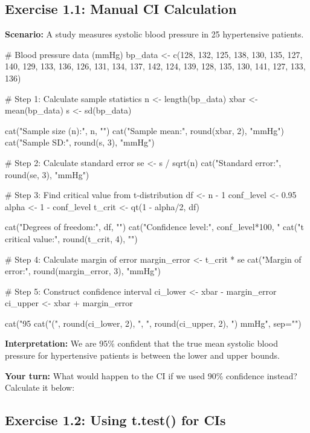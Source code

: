 \documentclass[11pt]{article}
\begin{document}
\subsection{Exercise 1.1: Manual CI Calculation}

\textbf{Scenario:} A study measures systolic blood pressure in 25 hypertensive patients.

\begin{rcode}
# Blood pressure data (mmHg)
bp_data <- c(128, 132, 125, 138, 130, 135, 127, 140, 129, 133,
             136, 126, 131, 134, 137, 142, 124, 139, 128, 135,
             130, 141, 127, 133, 136)

# Step 1: Calculate sample statistics
n <- length(bp_data)
xbar <- mean(bp_data)
s <- sd(bp_data)

cat("Sample size (n):", n, "\n")
cat("Sample mean:", round(xbar, 2), "mmHg\n")
cat("Sample SD:", round(s, 3), "mmHg\n\n")

# Step 2: Calculate standard error
se <- s / sqrt(n)
cat("Standard error:", round(se, 3), "mmHg\n\n")

# Step 3: Find critical value from t-distribution
df <- n - 1
conf_level <- 0.95
alpha <- 1 - conf_level
t_crit <- qt(1 - alpha/2, df)

cat("Degrees of freedom:", df, "\n")
cat("Confidence level:", conf_level*100, "%
cat("t critical value:", round(t_crit, 4), "\n\n")

# Step 4: Calculate margin of error
margin_error <- t_crit * se
cat("Margin of error:", round(margin_error, 3), "mmHg\n\n")

# Step 5: Construct confidence interval
ci_lower <- xbar - margin_error
ci_upper <- xbar + margin_error

cat("95%
cat("(", round(ci_lower, 2), ", ", round(ci_upper, 2), ") mmHg\n", sep="")
\end{rcode}

\textbf{Interpretation:} We are 95\% confident that the true mean systolic blood pressure for hypertensive patients is between the lower and upper bounds.

\vspace{0.5cm}

\textbf{Your turn:} What would happen to the CI if we used 90\% confidence instead? Calculate it below:

\vspace{2cm}

\subsection{Exercise 1.2: Using t.test() for CIs}
\end{document}
